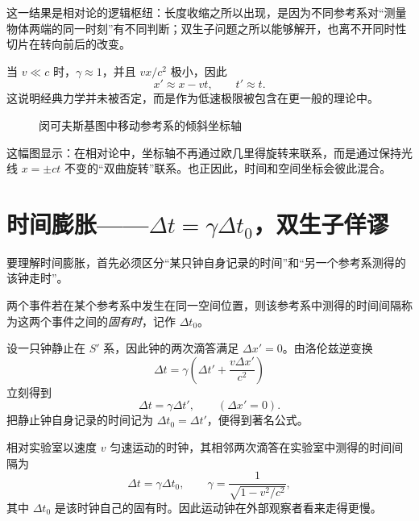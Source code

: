 这一结果是相对论的逻辑枢纽：长度收缩之所以出现，是因为不同参考系对“测量物体两端的同一时刻”有不同判断；双生子问题之所以能够解开，也离不开同时性切片在转向前后的改变。

\begin{remark}
当 $v\ll c$ 时，$\gamma\approx 1$，并且 $vx/c^2$ 极小，因此
\[
x'\approx x-vt,
\qquad t'\approx t.
\]
这说明经典力学并未被否定，而是作为低速极限被包含在更一般的理论中。
\end{remark}

\begin{figure}[H]
\centering
{}
\caption{闵可夫斯基图中移动参考系的倾斜坐标轴}
\end{figure}

这幅图显示：在相对论中，坐标轴不再通过欧几里得旋转来联系，而是通过保持光线 $x=\pm ct$ 不变的“双曲旋转”联系。也正因此，时间和空间坐标会彼此混合。

\section{时间膨胀——$\Delta t=\gamma\Delta t_0$，双生子佯谬}

要理解时间膨胀，首先必须区分“某只钟自身记录的时间”和“另一个参考系测得的该钟走时”。

\begin{definition}
两个事件若在某个参考系中发生在同一空间位置，则该参考系中测得的时间间隔称为这两个事件之间的\emph{固有时}，记作 $\Delta t_0$。
\end{definition}

设一只钟静止在 $S'$ 系，因此钟的两次滴答满足 $\Delta x'=0$。由洛伦兹逆变换
\[
\Delta t=\gamma\left(\Delta t'+\frac{v\Delta x'}{c^2}\right)
\]
立刻得到
\[
\Delta t=\gamma\Delta t',
\qquad (\Delta x'=0).
\]
把静止钟自身记录的时间记为 $\Delta t_0=\Delta t'$，便得到著名公式。

\begin{theorem}[时间膨胀]
相对实验室以速度 $v$ 匀速运动的时钟，其相邻两次滴答在实验室中测得的时间间隔为
\[
\Delta t=\gamma\Delta t_0,
\qquad
\gamma=\frac{1}{\sqrt{1-v^2/c^2}},
\]
其中 $\Delta t_0$ 是该时钟自己的固有时。因此运动钟在外部观察者看来走得更慢。
\end{theorem}

